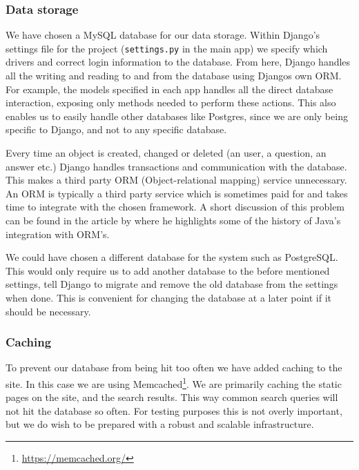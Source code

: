 
\subsubsection*{Data storage}
We have chosen a MySQL database for our data storage. Within Django's settings file for the project (\texttt{settings.py} in the main app) we specify which drivers and correct login information to the database. From here, Django handles all the writing and reading to and from the database using Djangos own ORM. For example, the models specified in each app handles all the direct database interaction, exposing only methods needed to perform these actions. This also enables us to easily handle other databases like Postgres, since we are only being specific to Django, and not to any specific database.

Every time an object is created, changed or deleted (an user, a question, an answer etc.) Django handles transactions and communication with the database. This makes a third party ORM (Object-relational mapping) service unnecessary. An ORM is typically a third party service which is sometimes paid for and takes time to integrate with the chosen framework. A short discussion of this problem can be found in the article by  where he highlights some of the history of Java's integration with ORM's.

We could have chosen a different database for the system such as PostgreSQL. This would only require us to add another database to the before mentioned settings, tell Django to migrate and remove the old database from the settings when done. This is convenient for changing the database at a later point if it should be necessary.

\subsubsection*{Caching}
To prevent our database from being hit too often we have added caching to the site. In this case we are using Memcached\footnote{\url{https://memcached.org/}}. We are primarily caching the static pages on the site, and the search results. This way common search queries will not hit the database so often. For testing purposes this is not overly important, but we do wish to be prepared with a robust and scalable infrastructure.

